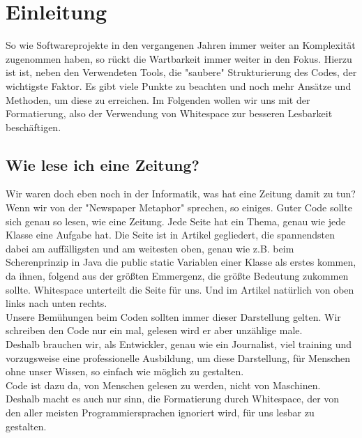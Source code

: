 \section{Einleitung}
	So wie Softwareprojekte in den vergangenen Jahren immer weiter an Komplexität zugenommen haben, so rückt die Wartbarkeit immer weiter in den Fokus.
	Hierzu ist ist, neben den Verwendeten Tools, die "saubere" Strukturierung des Codes, der wichtigste Faktor.
	Es gibt viele Punkte zu beachten und noch mehr Ansätze und Methoden, um diese zu erreichen.
	Im Folgenden wollen wir uns mit der Formatierung, also der Verwendung von Whitespace zur besseren Lesbarkeit beschäftigen.
	\subsection{Wie lese ich eine Zeitung?}
		Wir waren doch eben noch in der Informatik, was hat eine Zeitung damit zu tun?\\
		Wenn wir von der "Newspaper Metaphor" sprechen, so einiges.
		Guter Code sollte sich genau so lesen, wie eine Zeitung.
		Jede Seite hat ein Thema, genau wie jede Klasse eine Aufgabe hat.
		Die Seite ist in Artikel gegliedert, die spannendsten dabei am auffälligsten und am weitesten oben, genau wie z.B. beim Scherenprinzip in Java die public static Variablen einer Klasse als erstes kommen, da ihnen, folgend aus der größten Emmergenz, die größte Bedeutung zukommen sollte.
		Whitespace unterteilt die Seite für uns.
		Und im Artikel natürlich von oben links nach unten rechts.\\
		Unsere Bemühungen beim Coden sollten immer dieser Darstellung gelten.
		Wir schreiben den Code nur ein mal, gelesen wird er aber unzählige male.\\
		Deshalb brauchen wir, als Entwickler, genau wie ein Journalist, viel training und vorzugsweise eine professionelle Ausbildung, um diese Darstellung, für Menschen ohne unser Wissen, so einfach wie möglich zu gestalten.\\
		Code ist dazu da, von Menschen gelesen zu werden, nicht von Maschinen.
		Deshalb macht es auch nur sinn, die Formatierung durch Whitespace, der von den aller meisten Programmiersprachen ignoriert wird, für uns lesbar zu gestalten.
		
